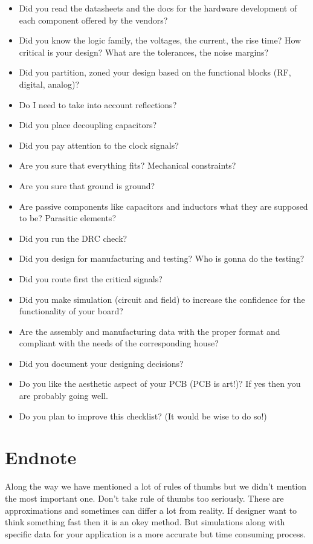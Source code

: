 \documentclass[final]{cubedoc}
\begin{document}
	\begin{itemize}
		\item Did you read the datasheets and the docs for the hardware development of each component offered by the vendors?
		\item Did you know the logic family, the voltages, the current, the rise time? How critical is your design?  What are the tolerances, the noise margins? 
		\item Did you partition, zoned your design based on the functional blocks (RF, digital, analog)?
		\item Do I need to take into account reflections? 
		\item Did you place decoupling capacitors?
		\item Did you pay attention to the clock signals?
		\item Are you sure that everything fits? Mechanical constraints?
		\item Are you sure that ground is ground?
		\item Are passive components like capacitors and inductors what they are supposed to be? Parasitic elements?
		\item Did you run the DRC check?
		\item Did you design for manufacturing and testing? Who is gonna do the testing?
		\item Did you route first the critical signals?
		\item Did you make simulation (circuit and field) to increase the confidence for the functionality of your board? 
		\item Are the assembly and manufacturing data with the proper format and compliant with the needs of the corresponding house?	
		\item Did you document your designing decisions?
		\item Do you like the aesthetic aspect of your PCB (PCB is art!)? If yes then you are probably going well.
		\item Do you plan to improve this checklist? (It would be wise to do so!)
	\end{itemize}
	
	\section{Endnote}
	
	Along the way we have mentioned a lot of rules of thumbs but we didn't mention the most important one. Don't take rule of thumbs too seriously. These are approximations and sometimes can differ a lot from reality. If designer want to think something fast then it is an okey method. But simulations along with specific data for your application is a more accurate but time consuming process. 
	
\end{document}
